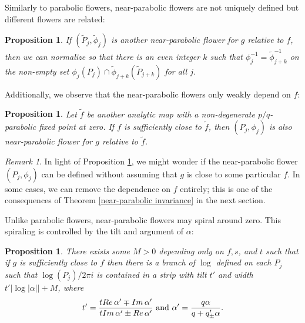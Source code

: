 \documentclass[12pt,letterpaper]{amsart}
\numberwithin{equation}{section}
\newtheorem{prop}[equation]{Proposition}
\theoremstyle{remark}
\newtheorem{remark}[equation]{Remark}
\theoremstyle{definition}
\begin{document}
Similarly to parabolic flowers,  near-parabolic flowers are not uniquely defined but  different flowers are  related:

\begin{prop}\label{prop:petals perturbed}
	If $(\tilde{P}_j, \tilde \phi_j)$ is another near-parabolic flower for $g$ relative to $f$, then we can normalize so that there is an even integer $k$ such that $\phi_j^{-1}= \tilde{\phi}_{j+k}^{-1}$ on the non-empty set $\phi_j(P_j)\cap \tilde\phi_{j+k}(\tilde P_{j+k})$ for all $j$. 
\end{prop}
Additionally, we observe that the near-parabolic flowers only weakly depend on $f$:
\begin{prop}\label{prop:near-parabolic independence}
	Let $\tilde{f}$ be another analytic map with a non-degenerate $p/q$-parabolic fixed point at zero. If $f$ is sufficiently close to $\tilde{f}$, then $(P_j, \phi_j)$ is also near-parabolic flower for $g$ relative to $\tilde{f}$.
\end{prop}
\begin{remark}
	In light of Proposition \ref{prop:near-parabolic independence}, we might wonder if the near-parabolic flower $(P_j, \phi_j)$ can be defined without assuming that $g$ is close to some particular $f$. In some cases, we can remove the dependence on $f$ entirely;
	 this is one of the consequences of Theorem \ref{near-parabolic invariance} in the next section.
\end{remark}


Unlike parabolic flowers, near-parabolic flowers may spiral around zero. This spiraling is controlled by the tilt and argument of $\alpha$:

\begin{prop}\label{prop:tilt}
	There exists some $M>0$ depending only on $f, s$, and $t$ such that if $g$ is sufficiently close to $f$ then there is a branch of $\log$ defined on each $P_{j}$ such that $\log (P_j)/2\pi i$ is contained in a strip with tilt $t'$ and width $t'|\log |\alpha||+M$, where  
	$$t' =\frac{t\emph{Re}\, \alpha'\mp\emph{Im}\, \alpha'}{ t\emph{Im}\,\alpha'\pm\emph{Re}\, \alpha'}\text{ and }\alpha' = \frac{q\alpha}{q+q_\pm'\alpha}.$$
\end{prop}
\end{document}
